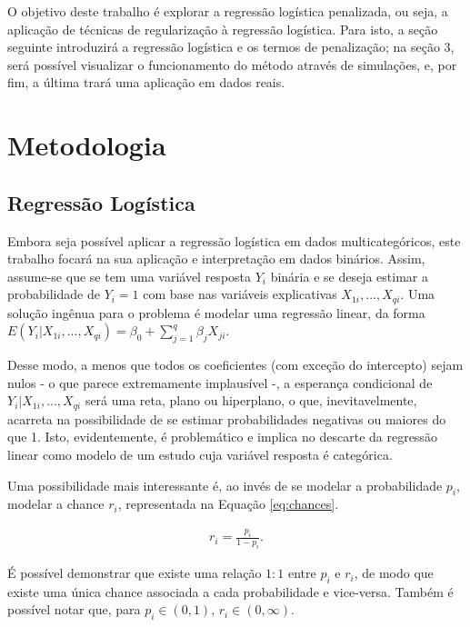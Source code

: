 \documentclass[
  12pt,
]{article}
\begin{document}
\quad O objetivo deste trabalho é explorar a regressão logística
penalizada, ou seja, a aplicação de técnicas de regularização à
regressão logística. Para isto, a seção seguinte introduzirá a regressão
logística e os termos de penalização; na seção 3, será possível
visualizar o funcionamento do método através de simulações, e, por fim,
a última trará uma aplicação em dados reais.

\section{Metodologia}

\subsection{Regressão Logística}

\quad Embora seja possível aplicar a regressão logística em dados
multicategóricos, este trabalho focará na sua aplicação e interpretação
em dados binários. Assim, assume-se que se tem uma variável resposta
\(Y_i\) binária e se deseja estimar a probabilidade de \(Y_i = 1\) com
base nas variáveis explicativas \(X_{1i}, ...,X_{qi}\). Uma solução
ingênua para o problema é modelar uma regressão linear, da forma
\(E(Y_i|X_{1i},...,X_{qi}) = \beta_0 + \sum_{j=1}^q \beta_j X_{ji}\).

\quad Desse modo, a menos que todos os coeficientes (com exceção do
intercepto) sejam nulos - o que parece extremamente implausível -, a
esperança condicional de \(Y_i|X_{1i}, ..., X_{qi}\) será uma reta,
plano ou hiperplano, o que, inevitavelmente, acarreta na possibilidade
de se estimar probabilidades negativas ou maiores do que 1. Isto,
evidentemente, é problemático e implica no descarte da regressão linear
como modelo de um estudo cuja variável resposta é categórica.

\quad Uma possibilidade mais interessante é, ao invés de se modelar a
probabilidade \(p_i\), modelar a chance \(r_i\), representada na Equação
\ref{eq:chances}.

\begin{eqnarray}
\label{eq:chances}
r_i = \frac{p_i}{1 - p_i}.
\end{eqnarray}

\quad É possível demonstrar que existe uma relação \(1:1\) entre \(p_i\)
e \(r_i\), de modo que existe uma única chance associada a cada
probabilidade e vice-versa. Também é possível notar que, para
\(p_i \in (0,1)\), \(r_i \in (0, \infty)\).
\end{document}
